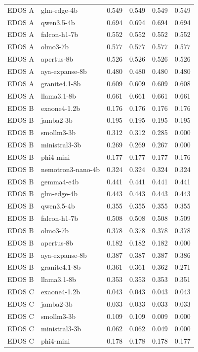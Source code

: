 \begin{table}[t]
\begin{tabular}{llrrrr}
EDOS A & glm-edge-4b & 0.549 & 0.549 & 0.549 & 0.549 \\
EDOS A & qwen3.5-4b & 0.694 & 0.694 & 0.694 & 0.694 \\
EDOS A & falcon-h1-7b & 0.552 & 0.552 & 0.552 & 0.552 \\
EDOS A & olmo3-7b & 0.577 & 0.577 & 0.577 & 0.577 \\
EDOS A & apertus-8b & 0.526 & 0.526 & 0.526 & 0.526 \\
EDOS A & aya-expanse-8b & 0.480 & 0.480 & 0.480 & 0.480 \\
EDOS A & granite4.1-8b & 0.609 & 0.609 & 0.609 & 0.608 \\
EDOS A & llama3.1-8b & 0.661 & 0.661 & 0.661 & 0.661 \\
EDOS B & exaone4-1.2b & 0.176 & 0.176 & 0.176 & 0.176 \\
EDOS B & jamba2-3b & 0.195 & 0.195 & 0.195 & 0.195 \\
EDOS B & smollm3-3b & 0.312 & 0.312 & 0.285 & 0.000 \\
EDOS B & ministral3-3b & 0.269 & 0.269 & 0.267 & 0.000 \\
EDOS B & phi4-mini & 0.177 & 0.177 & 0.177 & 0.176 \\
EDOS B & nemotron3-nano-4b & 0.324 & 0.324 & 0.324 & 0.324 \\
EDOS B & gemma4-e4b & 0.441 & 0.441 & 0.441 & 0.441 \\
EDOS B & glm-edge-4b & 0.443 & 0.443 & 0.443 & 0.443 \\
EDOS B & qwen3.5-4b & 0.355 & 0.355 & 0.355 & 0.355 \\
EDOS B & falcon-h1-7b & 0.508 & 0.508 & 0.508 & 0.509 \\
EDOS B & olmo3-7b & 0.378 & 0.378 & 0.378 & 0.378 \\
EDOS B & apertus-8b & 0.182 & 0.182 & 0.182 & 0.000 \\
EDOS B & aya-expanse-8b & 0.387 & 0.387 & 0.387 & 0.386 \\
EDOS B & granite4.1-8b & 0.361 & 0.361 & 0.362 & 0.271 \\
EDOS B & llama3.1-8b & 0.353 & 0.353 & 0.353 & 0.351 \\
EDOS C & exaone4-1.2b & 0.043 & 0.043 & 0.043 & 0.043 \\
EDOS C & jamba2-3b & 0.033 & 0.033 & 0.033 & 0.033 \\
EDOS C & smollm3-3b & 0.109 & 0.109 & 0.009 & 0.000 \\
EDOS C & ministral3-3b & 0.062 & 0.062 & 0.049 & 0.000 \\
EDOS C & phi4-mini & 0.178 & 0.178 & 0.178 & 0.177 \\

\end{tabular}
\end{table}
